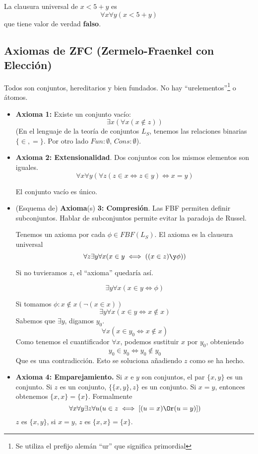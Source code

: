 \begin{example}
	La clausura universal de $x < 5 + y$ es $$\forall x\forall y (x < 5 + y)$$ que tiene valor de verdad \textbf{falso}.
\end{example}

\subsection{Axiomas de ZFC (Zermelo-Fraenkel con Elección)}
	Todos son conjuntos, hereditarios y bien fundados.
	No hay ``urelementos''\footnote{Se utiliza el prefijo alemán ``ur'' que significa primordial} o átomos.
	\begin{itemize}
		\item \textbf{Axioma 1:} Existe un conjunto vacío:
		$$\exists x (\forall x (x\notin z))$$
		(En el lenguaje de la teoría de conjuntos $L_S$, tenemos las relaciones binarias $\{\in, =\}$. Por otro lado $Fun: \emptyset$, $Cons: \emptyset$).
		\item \textbf{Axioma 2: Extensionalidad}.
		Dos conjuntos con los mismos elementos son iguales.
		$$\forall x\forall y(\forall z (z\in x\iff z\in y)\iff x = y)$$
		\begin{corol}
			El conjunto vacío es único.
		\end{corol}
		
		\item (Esquema de) \textbf{Axioma}(s) \textbf{3: Compresión}. Las FBF permiten definir subconjuntos. Hablar de subconjuntos permite evitar la paradoja de Russel.
		
		Tenemos un axioma por cada $\phi\in FBF(L_S)$. El axioma es la clausura universal
		$$\forall z \exists y \forall x(x\in y\iff((x\in z)\y \phi))$$
		
		Si no tuvieramos $z$, el ``axioma'' quedaría así.
		
		$$\exists y \forall x (x\in y\iff \phi)$$
		
		Si tomamos $\phi: x\notin x (\neg (x\in x))$
		$$\exists y \forall x (x\in y\iff x\notin x)$$
		Sabemos que $\exists y$, digamos $y_0$.
		$$\forall x (x\in y_0 \iff x\notin x)$$ 
		Como tenemos el cuantificador $\forall x$, podemos sustituir $x$ por $y_0$, obteniendo
		$$y_0\in y_0 \iff y_0\notin y_0$$
		Que es una contradicción. Esto se soluciona añadiendo $z$ como se ha hecho.
		
		\item \textbf{Axioma 4: Emparejamiento.} Si $x$ e $y$ son conjuntos, el par $\{x, y\}$ es un conjunto. Si $z$ es un conjunto, $\{\{x,y\},z\}$ es un conjunto. Si $x = y$, entonces obtenemos $\{x,x\} = \{x\}$. Formalmente
		$$\forall x\forall y\exists z\forall u(u\in z\iff \left[(u=x)\Or (u=y)\right])$$
		$z$ es $\{x,y\}$, si $x=y$, $z$ es $\{x,x\}=\{x\}$.
	\end{itemize}
	
